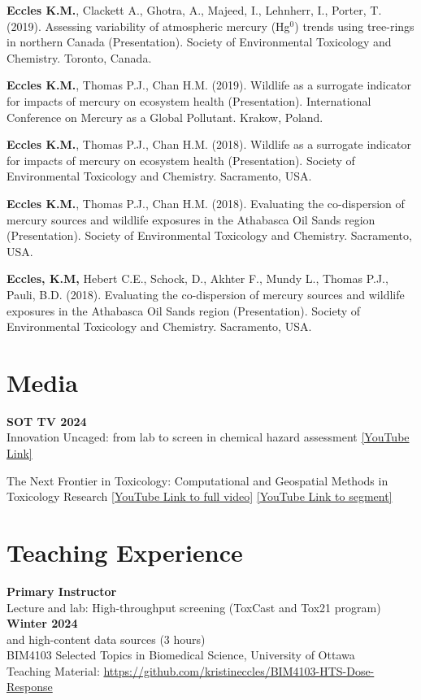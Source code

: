 \documentclass[margin,line]{res}
\begin{document}
\begin{resume}
\textbf{Eccles K.M.}, Clackett A., Ghotra, A., Majeed, I., Lehnherr, I., Porter, T. (2019). Assessing variability of atmospheric mercury (Hg$^{0}$) trends using tree-rings in northern Canada (Presentation). Society of Environmental Toxicology and Chemistry. Toronto, Canada.

\textbf{Eccles K.M.}, Thomas P.J., Chan H.M. (2019). Wildlife as a surrogate indicator for impacts of mercury on ecosystem health (Presentation). International Conference on Mercury as a Global Pollutant. Krakow, Poland.

\textbf{Eccles K.M.}, Thomas P.J., Chan H.M. (2018). Wildlife as a surrogate indicator for impacts of mercury on ecosystem health (Presentation). Society of Environmental Toxicology and Chemistry. Sacramento, USA.

\textbf{Eccles K.M.}, Thomas P.J., Chan H.M. (2018). Evaluating the co-dispersion of mercury sources and wildlife exposures in the Athabasca Oil Sands region (Presentation). Society of Environmental Toxicology and Chemistry. Sacramento, USA.

\textbf{Eccles, K.M,} Hebert C.E., Schock, D., Akhter F., Mundy L., Thomas P.J., Pauli, B.D. (2018). Evaluating the co-dispersion of mercury sources and wildlife exposures in the Athabasca Oil Sands region (Presentation). Society of Environmental Toxicology and Chemistry. Sacramento, USA.


\vspace*{.1in}
\section{\sc Media}
\textbf{SOT TV 2024}\\
Innovation Uncaged: from lab to screen in chemical hazard assessment \href{https://www.youtube.com/watch?v=6Pg7DvoHgP0}{[YouTube Link]}

The Next Frontier in Toxicology: Computational and Geospatial Methods in Toxicology Research \href{https://www.youtube.com/watch?v=-vlSMeWfeKs\&t=939s}{[YouTube Link to full video]}
\href{https://www.youtube.com/watch?v=vgu6d1uT8K4}{[YouTube Link to segment]}


\vspace*{.1in}
\section{\sc Teaching Experience}
\textbf{Primary Instructor}\\
Lecture and lab: High-throughput screening (ToxCast and Tox21 program) \hfill {\textbf{Winter 2024}}\\
and high-content data sources (3 hours)\\
BIM4103 Selected Topics in Biomedical Science, University of Ottawa\\
Teaching Material: \url{https://github.com/kristineccles/BIM4103-HTS-Dose-Response}


\end{resume}
\end{document}
